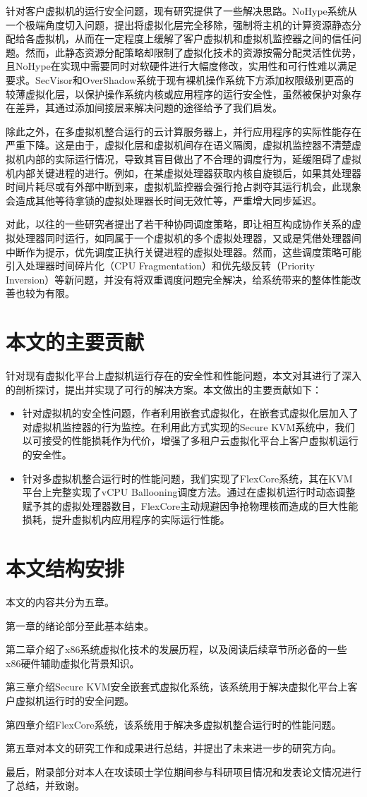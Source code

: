 针对客户虚拟机的运行安全问题，现有研究提供了一些解决思路。NoHype\cite{keller2010nohype}系统从一个极端角度切入问题，提出将虚拟化层完全移除，强制将主机的计算资源静态分配给各虚拟机，从而在一定程度上缓解了客户虚拟机和虚拟机监控器之间的信任问题。然而，此静态资源分配策略却限制了虚拟化技术的资源按需分配灵活性优势，且NoHype在实现中需要同时对软硬件进行大幅度修改，实用性和可行性难以满足要求。SecVisor\cite{seshadri2007secvisor}和OverShadow\cite{chen2008overshadow}系统于现有裸机操作系统下方添加权限级别更高的较薄虚拟化层，以保护操作系统内核或应用程序的运行安全性，虽然被保护对象存在差异，其通过添加间接层来解决问题的途径给予了我们启发。

除此之外，在多虚拟机整合运行的云计算服务器上，并行应用程序的实际性能存在严重下降。这是由于，虚拟化层和虚拟机间存在语义隔阂，虚拟机监控器不清楚虚拟机内部的实际运行情况，导致其盲目做出了不合理的调度行为，延缓阻碍了虚拟机内部关键进程的进行。例如，在某虚拟处理器获取内核自旋锁后，如果其处理器时间片耗尽或有外部中断到来，虚拟机监控器会强行抢占剥夺其运行机会，此现象会造成其他等待拿锁的虚拟处理器长时间无效忙等，严重增大同步延迟。

对此，以往的一些研究者提出了若干种协同调度策略，即让相互构成协作关系的虚拟处理器同时运行，如同属于一个虚拟机的多个虚拟处理器，又或是凭借处理器间中断作为提示，优先调度正执行关键进程的虚拟处理器。然而，这些调度策略可能引入处理器时间碎片化（CPU Fragmentation）和优先级反转（Priority Inversion）等新问题，并没有将双重调度问题完全解决，给系统带来的整体性能改善也较为有限。

\section{本文的主要贡献}

针对现有虚拟化平台上虚拟机运行存在的安全性和性能问题，本文对其进行了深入的剖析探讨，提出并实现了可行的解决方案。本文做出的主要贡献如下：

\begin{itemize}
\item 针对虚拟机的安全性问题，作者利用嵌套式虚拟化，在嵌套式虚拟化层加入了对虚拟机监控器的行为监控。在利用此方式实现的Secure KVM系统中，我们以可接受的性能损耗作为代价，增强了多租户云虚拟化平台上客户虚拟机运行的安全性。
\item 针对多虚拟机整合运行时的性能问题，我们实现了FlexCore系统，其在KVM平台上完整实现了vCPU Ballooning调度方法。通过在虚拟机运行时动态调整赋予其的虚拟处理器数目，FlexCore主动规避因争抢物理核而造成的巨大性能损耗，提升虚拟机内应用程序的实际运行性能。
\end{itemize}

\section{本文结构安排}

本文的内容共分为五章。

第一章的绪论部分至此基本结束。

第二章介绍了x86系统虚拟化技术的发展历程，以及阅读后续章节所必备的一些x86硬件辅助虚拟化背景知识。

第三章介绍Secure KVM安全嵌套式虚拟化系统，该系统用于解决虚拟化平台上客户虚拟机运行时的安全问题。

第四章介绍FlexCore系统，该系统用于解决多虚拟机整合运行时的性能问题。

第五章对本文的研究工作和成果进行总结，并提出了未来进一步的研究方向。

最后，附录部分对本人在攻读硕士学位期间参与科研项目情况和发表论文情况进行了总结，并致谢。



